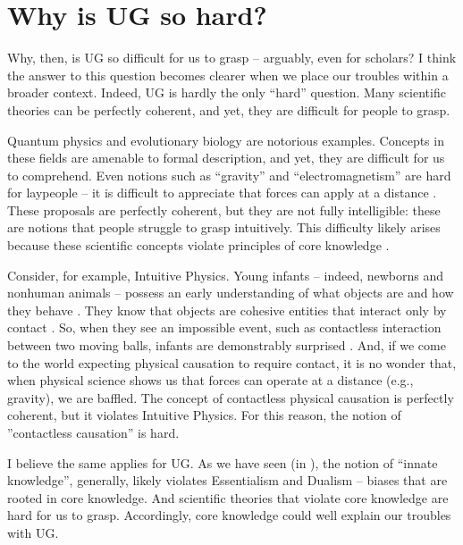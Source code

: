 \documentclass[output=paper,colorlinks,citecolor=brown
]{langscibook}
\begin{document}
\section{Why is UG so hard?}

Why, then, is UG so difficult for us to grasp -- arguably, even for scholars? I think the answer to this question becomes clearer when we place our troubles within a broader context. Indeed, UG is hardly the only “hard” question. Many scientific theories can be perfectly coherent, and yet, they are difficult for people to grasp.

Quantum physics and evolutionary biology are notorious examples. Concepts in these fields are amenable to formal description, and yet, they are difficult for us to comprehend. Even notions such as “gravity” and “electromagnetism” are hard for laypeople -- it is difficult to appreciate that forces can apply at a distance  \citep{chomsky2015kind,shtulman2017scienceblind}. These proposals are perfectly coherent, but they are not fully intelligible: these are notions that people struggle to grasp intuitively. This difficulty likely arises because these scientific concepts violate principles of core knowledge \citep{shtulman2017scienceblind}. 

Consider, for example, Intuitive Physics. Young infants -- indeed, newborns and nonhuman animals -- possess an early understanding of what objects are and how they behave \citep{mascalzoni2013cradle,regolin1995perception,vallortigara2021born}. They know that objects are cohesive entities that interact only by contact \citep{spelke1992origins}. So, when they see an impossible event, such as contactless interaction between two moving balls, infants are demonstrably surprised \citep{mascalzoni2013cradle}. And, if we come to the world expecting physical causation to require contact, it is no wonder that, when physical science shows us that forces can operate at a distance (e.g., gravity), we are baffled. The concept of contactless physical causation is perfectly coherent, but it violates Intuitive Physics.  For this reason, the notion of ”contactless causation” is hard. 

I believe the same applies for UG. As we have seen (in ), the notion of “innate knowledge”, generally, likely violates Essentialism and Dualism -- biases that are rooted in core knowledge. And scientific theories that violate core knowledge are hard for us to grasp. Accordingly, core knowledge could well explain our troubles with UG.
\end{document}
